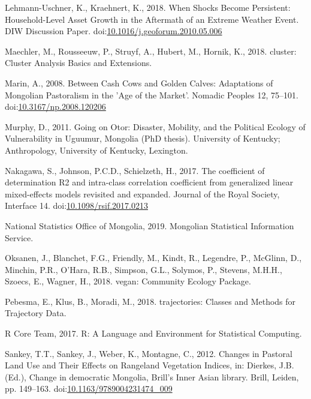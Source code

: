 \documentclass[]{elsarticle} %
\newlength{\cslhangindent}
\newenvironment{cslreferences}%
  {\setlength{\parindent}{0pt}%
  \everypar{\setlength{\hangindent}{\cslhangindent}}\ignorespaces}%
  {\par}
\begin{document}
\begin{cslreferences}
\leavevmode\hypertarget{ref-LehmannUschner.2018}{}%
Lehmann-Uschner, K., Kraehnert, K., 2018. When Shocks Become Persistent:
Household-Level Asset Growth in the Aftermath of an Extreme Weather
Event. DIW Discussion Paper.
doi:\href{https://doi.org/10.1016/j.geoforum.2010.05.006}{10.1016/j.geoforum.2010.05.006}

\leavevmode\hypertarget{ref-Maechler.2018}{}%
Maechler, M., Rousseeuw, P., Struyf, A., Hubert, M., Hornik, K., 2018.
cluster: Cluster Analysis Basics and Extensions.

\leavevmode\hypertarget{ref-Marin.2008}{}%
Marin, A., 2008. Between Cash Cows and Golden Calves: Adaptations of
Mongolian Pastoralism in the 'Age of the Market'. Nomadic Peoples 12,
75--101.
doi:\href{https://doi.org/10.3167/np.2008.120206}{10.3167/np.2008.120206}

\leavevmode\hypertarget{ref-Murphy.2011}{}%
Murphy, D., 2011. Going on Otor: Disaster, Mobility, and the Political
Ecology of Vulnerability in Uguumur, Mongolia (PhD thesis). University
of Kentucky; Anthropology, University of Kentucky, Lexington.

\leavevmode\hypertarget{ref-Nakagawa.2017}{}%
Nakagawa, S., Johnson, P.C.D., Schielzeth, H., 2017. The coefficient of
determination R2 and intra-class correlation coefficient from
generalized linear mixed-effects models revisited and expanded. Journal
of the Royal Society, Interface 14.
doi:\href{https://doi.org/10.1098/rsif.2017.0213}{10.1098/rsif.2017.0213}

\leavevmode\hypertarget{ref-NationalStatisticsOfficeofMongolia.2019}{}%
National Statistics Office of Mongolia, 2019. Mongolian Statistical
Information Service.

\leavevmode\hypertarget{ref-Oksanen.2018}{}%
Oksanen, J., Blanchet, F.G., Friendly, M., Kindt, R., Legendre, P.,
McGlinn, D., Minchin, P.R., O'Hara, R.B., Simpson, G.L., Solymos, P.,
Stevens, M.H.H., Szoecs, E., Wagner, H., 2018. vegan: Community Ecology
Package.

\leavevmode\hypertarget{ref-Pebesma.2018}{}%
Pebesma, E., Klus, B., Moradi, M., 2018. trajectories: Classes and
Methods for Trajectory Data.

\leavevmode\hypertarget{ref-RCoreTeam.2017}{}%
R Core Team, 2017. R: A Language and Environment for Statistical
Computing.

\leavevmode\hypertarget{ref-Sankey.2012}{}%
Sankey, T.T., Sankey, J., Weber, K., Montagne, C., 2012. Changes in
Pastoral Land Use and Their Effects on Rangeland Vegetation Indices, in:
Dierkes, J.B. (Ed.), Change in democratic Mongolia, Brill's Inner Asian
library. Brill, Leiden, pp. 149--163.
doi:\href{https://doi.org/10.1163/9789004231474_009}{10.1163/9789004231474\_009}


\end{cslreferences}
\end{document}
